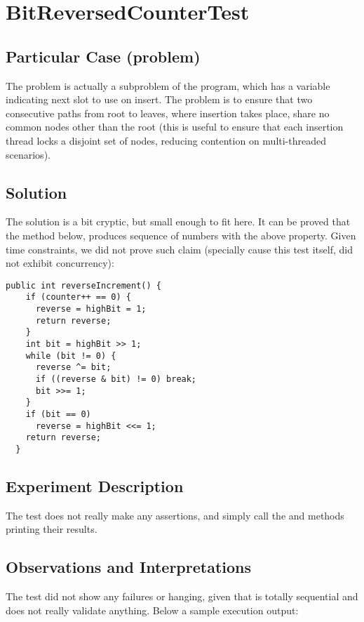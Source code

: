 \section{\textbf{BitReversedCounterTest}}

\subsection{Particular Case (problem)}
The problem is actually a subproblem of the 
program, which has a  variable indicating next slot to use on
insert. The problem is to ensure that two consecutive paths from root
to leaves, where insertion takes place, share no common nodes other
than the root (this is useful to ensure that each insertion thread
locks a disjoint set of nodes, reducing contention on multi-threaded
scenarios). 

\subsection{Solution}
The solution is a bit cryptic, but small enough to fit here. It can be
proved that the  method below, produces sequence
of numbers with the above property. Given time constraints, we did not
prove such claim (specially cause this test itself, did not exhibit
concurrency): \\

\begin{lstlisting}[style=numbers]
  public int reverseIncrement() {
    if (counter++ == 0) {
      reverse = highBit = 1;
      return reverse;
    }
    int bit = highBit >> 1;
    while (bit != 0) {
      reverse ^= bit;
      if ((reverse & bit) != 0) break;
      bit >>= 1;
    }
    if (bit == 0)
      reverse = highBit <<= 1;
    return reverse;
  }
\end{lstlisting}
\hfill

\subsection{Experiment Description}
The test does not really make any assertions, and simply call the
 and  methods printing their
results. 

\subsection{Observations and Interpretations}
The test did not show any failures or hanging, given that is totally
sequential and does not really validate anything. Below a sample
execution output: \\

